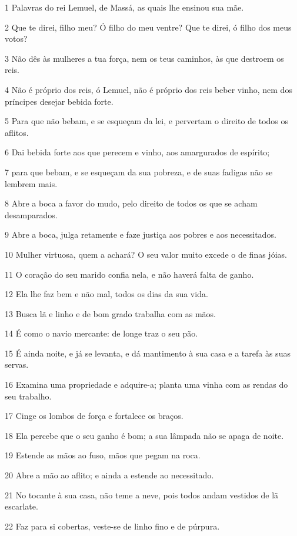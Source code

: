\par 1 Palavras do rei Lemuel, de Massá, as quais lhe ensinou sua mãe.
\par 2 Que te direi, filho meu? Ó filho do meu ventre? Que te direi, ó filho dos meus votos?
\par 3 Não dês às mulheres a tua força, nem os teus caminhos, às que destroem os reis.
\par 4 Não é próprio dos reis, ó Lemuel, não é próprio dos reis beber vinho, nem dos príncipes desejar bebida forte.
\par 5 Para que não bebam, e se esqueçam da lei, e pervertam o direito de todos os aflitos.
\par 6 Dai bebida forte aos que perecem e vinho, aos amargurados de espírito;
\par 7 para que bebam, e se esqueçam da sua pobreza, e de suas fadigas não se lembrem mais.
\par 8 Abre a boca a favor do mudo, pelo direito de todos os que se acham desamparados.
\par 9 Abre a boca, julga retamente e faze justiça aos pobres e aos necessitados.
\par 10 Mulher virtuosa, quem a achará? O seu valor muito excede o de finas jóias.
\par 11 O coração do seu marido confia nela, e não haverá falta de ganho.
\par 12 Ela lhe faz bem e não mal, todos os dias da sua vida.
\par 13 Busca lã e linho e de bom grado trabalha com as mãos.
\par 14 É como o navio mercante: de longe traz o seu pão.
\par 15 É ainda noite, e já se levanta, e dá mantimento à sua casa e a tarefa às suas servas.
\par 16 Examina uma propriedade e adquire-a; planta uma vinha com as rendas do seu trabalho.
\par 17 Cinge os lombos de força e fortalece os braços.
\par 18 Ela percebe que o seu ganho é bom; a sua lâmpada não se apaga de noite.
\par 19 Estende as mãos ao fuso, mãos que pegam na roca.
\par 20 Abre a mão ao aflito; e ainda a estende ao necessitado.
\par 21 No tocante à sua casa, não teme a neve, pois todos andam vestidos de lã escarlate.
\par 22 Faz para si cobertas, veste-se de linho fino e de púrpura.

